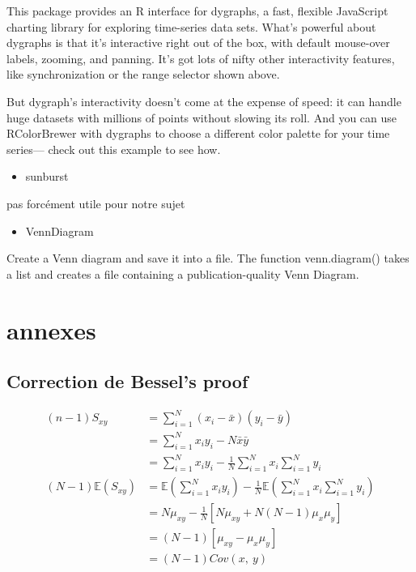 \documentclass[
]{report}
\providecommand{\tightlist}{%
  \setlength{\itemsep}{0pt}\setlength{\parskip}{0pt}}
\begin{document}
This package provides an R interface for dygraphs, a fast, flexible JavaScript charting library for exploring time-series data sets. What's powerful about dygraphs is that it's interactive right out of the box, with default mouse-over labels, zooming, and panning. It's got lots of nifty other interactivity features, like synchronization or the range selector shown above.

But dygraph's interactivity doesn't come at the expense of speed: it can handle huge datasets with millions of points without slowing its roll. And you can use RColorBrewer with dygraphs to choose a different color palette for your time series--- check out this example to see how.

\begin{itemize}
\tightlist
\item
  sunburst
\end{itemize}

pas forcément utile pour notre sujet

\begin{itemize}
\tightlist
\item
  VennDiagram
\end{itemize}

Create a Venn diagram and save it into a file. The function venn.diagram() takes a list and creates a file containing a publication-quality Venn Diagram.

\hypertarget{annexes}{%
\chapter{annexes}\label{annexes}}

\hypertarget{correction-de-bessels-proof}{%
\section{Correction de Bessel's proof}\label{correction-de-bessels-proof}}

\begin{align*}
(n-1)S_{xy} &= \sum_{i=1}^{N}(x_i-\bar x)(y_i - \bar y) \\
&= \sum_{i=1}^{N} x_i y_i -N\bar x \bar y\\
&= \sum_{i=1}^{N} x_i y_i - \frac{1}{N}\sum_{i=1}^{N} x_i \sum_{i=1}^{N} y_i\\
(N-1) \mathbb{E}(S_{xy}) &= \mathbb{E}\left(\sum_{i=1}^{N} x_i y_i\right) 
- \frac{1}{N}\mathbb{E}\left(\sum_{i=1}^{N} x_i \sum_{i=1}^{N} y_i\right)\\
&= N\mu_{xy} - \frac{1}{N}[N\mu_{xy} + N(N-1)\mu_x \mu_y]\\ 
&= (N-1)[\mu_{xy}-\mu_x\mu_y]\\
&= (N-1)Cov(x,~y)
\end{align*}
\end{document}
